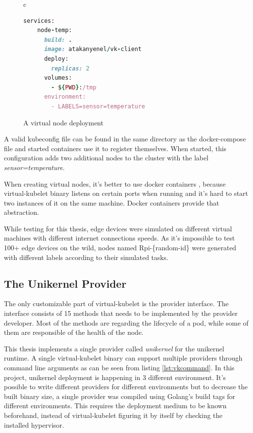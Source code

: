 \begin{figure}[htpb]
  \centering
  \begin{tabular}{c}
  \begin{lstlisting}[language=ruby]
    services:
    node-temp:
      build: .
      image: atakanyenel/vk-client
      deploy:
        replicas: 2
      volumes:
        - ${PWD}:/tmp
      environment:
        - LABELS=sensor=temperature
\end{lstlisting}
\end{tabular}
\caption{A virtual node deployment}\label{fig:docker-compose}
\end{figure}


A valid kubeconfig file can be found in the same directory as the docker-compose file and started containers use it to register themselves. When started, this configuration adds two additional nodes to the cluster with the label \textit{sensor=temperature}.

When creating virtual nodes, it's better to use docker containers , because virtual-kubelet binary listens on certain ports when running and it's hard to start two instances of it on the same machine. Docker containers provide that abstraction.

While testing for this thesis, edge devices were simulated on different virtual machines with different internet connections speeds. As it's impossible to test 100+ edge devices on the wild, nodes named Rpi-\{random-id\} were generated with different labels according to their simulated tasks.

\subsection{The Unikernel Provider}
The only customizable part of virtual-kubelet is the provider interface. The interface consists of 15 methods that needs to be implemented by the provider developer. Most of the methods are regarding the lifecycle of a pod, while some of them are responsible of the health of the node. 

This thesis implements a single provider called \textit{unikernel} for the unikernel runtime. A single virtual-kubelet binary can support multiple providers through command line arguments as can be seen from listing \ref{lst:vkcommand}. In this project, unikernel deployment is happening in 3 different environment. It's possible to write different providers for different environments but to decrease the built binary size, a single provider was compiled using Golang's build tags for different environments. This requires the deployment medium to be known beforehand, instead of virtual-kubelet figuring it by itself by checking the installed hypervisor.

